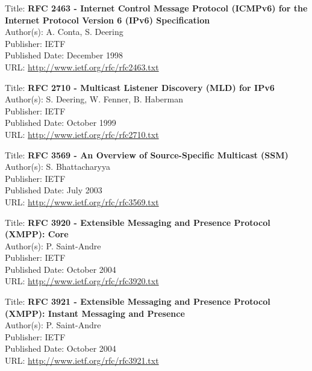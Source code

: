 Title: \textbf{RFC 2463 - Internet Control Message Protocol (ICMPv6) for the} \\
\hspace{15mm} \textbf{Internet Protocol Version 6 (IPv6) Specification} \\
Author(s): A. Conta, S. Deering \\
Publisher: IETF \\ 
Published Date: December 1998 \\ 
URL: \url{http://www.ietf.org/rfc/rfc2463.txt}   


Title: \textbf{RFC 2710 - Multicast Listener Discovery (MLD) for IPv6} \\ 
Author(s): S. Deering, W. Fenner, B. Haberman \\
Publisher: IETF \\ 
Published Date: October 1999 \\ 
URL: \url{http://www.ietf.org/rfc/rfc2710.txt}   


Title: \textbf{RFC 3569 - An Overview of Source-Specific Multicast (SSM)} \\ 
Author(s): S. Bhattacharyya \\
Publisher: IETF \\ 
Published Date: July 2003 \\ 
URL: \url{http://www.ietf.org/rfc/rfc3569.txt}   


Title: \textbf{RFC 3920 - Extensible Messaging and Presence Protocol (XMPP): Core} \\ 
Author(s): P. Saint-Andre \\
Publisher: IETF \\ 
Published Date: October 2004 \\ 
URL: \url{http://www.ietf.org/rfc/rfc3920.txt}   


Title: \textbf{RFC 3921 - Extensible Messaging and Presence Protocol (XMPP): Instant Messaging and Presence} \\ 
Author(s): P. Saint-Andre \\
Publisher: IETF \\ 
Published Date: October 2004 \\ 
URL: \url{http://www.ietf.org/rfc/rfc3921.txt}   
